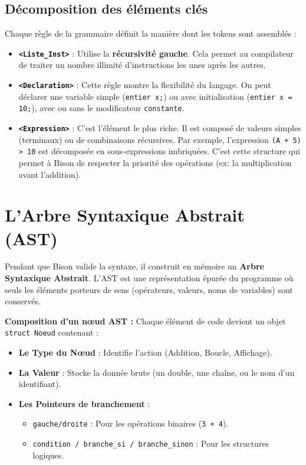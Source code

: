 \documentclass[pfe ,titlesmallcaps]{isi_report}
\begin{document}
\subsection{Décomposition des éléments clés}
Chaque règle de la grammaire définit la manière dont les tokens sont assemblés :
\begin{itemize}
	\item \textbf{\texttt{<Liste\_Inst>}} : Utilise la \textbf{récursivité gauche}. Cela permet au compilateur de traiter un nombre illimité d'instructions les unes après les autres.
	\item \textbf{\texttt{<Declaration>}} : Cette règle montre la flexibilité du langage. On peut déclarer une variable simple (\texttt{entier x;}) ou avec initialisation (\texttt{entier x = 10;}), avec ou sans le modificateur \texttt{constante}.
	\item \textbf{\texttt{<Expression>}} : C'est l'élément le plus riche. Il est composé de valeurs simples (terminaux) ou de combinaisons récursives. Par exemple, l'expression \texttt{(A + 5) > 10} est décomposée en sous-expressions imbriquées. C'est cette structure qui permet à Bison de respecter la priorité des opérations (ex: la multiplication avant l'addition).
\end{itemize}

\section{L'Arbre Syntaxique Abstrait (AST)}
Pendant que Bison valide la syntaxe, il construit en mémoire un \textbf{Arbre Syntaxique Abstrait}. L'AST est une représentation épurée du programme où seuls les éléments porteurs de sens (opérateurs, valeurs, noms de variables) sont conservés.

\textbf{Composition d'un nœud AST :}
Chaque élément de code devient un objet \texttt{struct Noeud} contenant :
\begin{itemize}
	\item \textbf{Le Type du Nœud} : Identifie l'action (Addition, Boucle, Affichage).
	\item \textbf{La Valeur} : Stocke la donnée brute (un double, une chaîne, ou le nom d'un identifiant).
	\item \textbf{Les Pointeurs de branchement} :
	      \begin{itemize}
		      \item \texttt{gauche/droite} : Pour les opérations binaires (\texttt{3 + 4}).
		      \item \texttt{condition / branche\_si / branche\_sinon} : Pour les structures logiques.
	      \end{itemize}
\end{itemize}
\end{document}
